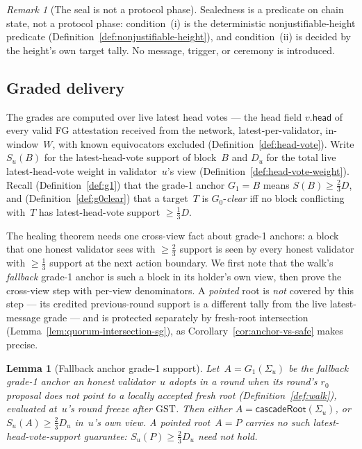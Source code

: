 \ifx\litemode\undefined\documentclass{article}\fi
\newcommand{\GST}{\ensuremath{\mathrm{GST}}\xspace}
\newcommand{\Supp}{\ensuremath{S}}          %
\newcommand{\Dvote}{\ensuremath{D}}         %
\newcommand{\Wvote}{\ensuremath{W}}         %
\newcommand{\headf}{\mathsf{head}}          %
\newcommand{\Gzero}{\ensuremath{G_{0}}}
\newcommand{\Gone}{\ensuremath{G_{1}}}
\newcommand{\rzero}{\ensuremath{r_{0}}}                 %
\newcommand{\cascadeRoot}{\textsf{cascadeRoot}\xspace}
\theoremstyle{plain}
\newtheorem{lemma}{Lemma}
\theoremstyle{definition}
\theoremstyle{remark}
\newtheorem{remark}[theorem]{Remark}
\begin{document}
\begin{remark}[The seal is not a protocol phase]\label{rem:seal-deterministic}
Sealedness is a predicate on chain state, not a protocol phase: condition~(i) is
the deterministic nonjustifiable-height predicate
(Definition~\ref{def:nonjustifiable-height}), and condition~(ii) is decided by
the height's own target tally.  No message, trigger, or ceremony is introduced.
\end{remark}

\subsection{Graded delivery}\label{sec:grades}

The grades are computed over live latest head votes --- the head field
\(v.\headf\) of every valid FG attestation received from the network,
latest-per-validator, in-window~\(\Wvote\), with known equivocators excluded
(Definition~\ref{def:head-vote}).  Write \(\Supp_u(B)\) for the
latest-head-vote support of block~\(B\) and \(\Dvote_u\) for the total live
latest-head-vote weight in validator~\(u\)'s view
(Definition~\ref{def:head-vote-weight}).  Recall (Definition~\ref{def:g1}) that
the grade-1 anchor \(\Gone = B\) means
\(\Supp(B) \geq \tfrac{2}{3}\Dvote\), and (Definition~\ref{def:g0clear}) that a
target~\(T\) is \(\Gzero\)-\emph{clear} iff no block conflicting with~\(T\) has
latest-head-vote support \(\geq \tfrac{1}{3}\Dvote\).

The healing theorem needs one cross-view fact about grade-1 anchors: a block
that one honest validator sees with $\geq\tfrac23$ support is seen by every
honest validator with $\geq\tfrac13$ support at the next action boundary.  We
first note that the walk's \emph{fallback} grade-1 anchor is such a block in its
holder's own view,
then prove the cross-view step with per-view denominators.  A \emph{pointed}
root is \emph{not} covered by this step --- its credited previous-round support
is a different tally from the live latest-message grade --- and is protected
separately by fresh-root intersection (Lemma~\ref{lem:quorum-intersection-sg}), as
Corollary~\ref{cor:anchor-vs-safe} makes precise.

\begin{lemma}[Fallback anchor grade-1 support]\label{lem:anchor-support}
Let~\(A = \Gone(\Sigma_u)\) be the \emph{fallback grade-1 anchor} an honest
validator~\(u\) adopts in a round when its round's \(\rzero\) proposal does not
point to a locally accepted fresh root (Definition~\ref{def:walk}), evaluated at~\(u\)'s
round freeze after \GST.  Then either \(A = \cascadeRoot(\Sigma_u)\), or
\(\Supp_u(A) \geq \tfrac{2}{3}\Dvote_u\) in~\(u\)'s own view.  A \emph{pointed}
root~\(A=P\) carries \emph{no} such latest-head-vote-support guarantee:
\(\Supp_u(P) \geq \tfrac{2}{3}\Dvote_u\) need not hold.
\end{lemma}
\end{document}

